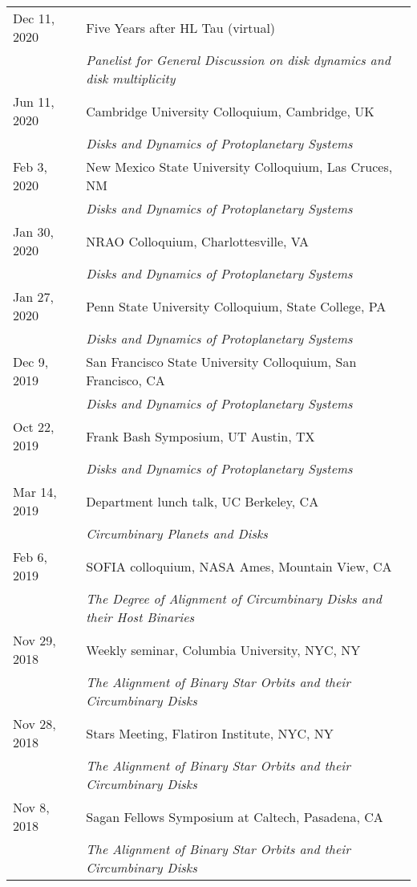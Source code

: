 \begin{longtable}{@{\hspace{10pt}}p{1.2in}l}
  Dec 11, 2020 & Five Years after HL Tau (virtual) \\ 
  & \emph{Panelist for General Discussion on disk dynamics and disk multiplicity} \\[\rowskip]
  Jun 11, 2020 & Cambridge University Colloquium, Cambridge, UK \\ 
  & \emph{Disks and Dynamics of Protoplanetary Systems} \\[\rowskip]
  Feb 3, 2020 & New Mexico State University Colloquium, Las Cruces, NM \\
  & \emph{Disks and Dynamics of Protoplanetary Systems} \\[\rowskip]
  Jan 30, 2020 & NRAO Colloquium, Charlottesville, VA \\
  & \emph{Disks and Dynamics of Protoplanetary Systems} \\[\rowskip]
  Jan 27, 2020 & Penn State University Colloquium, State College, PA \\
  & \emph{Disks and Dynamics of Protoplanetary Systems} \\[\rowskip]
  Dec 9, 2019 & San Francisco State University Colloquium, San Francisco, CA \\
  & \emph{Disks and Dynamics of Protoplanetary Systems} \\[\rowskip]
  Oct 22, 2019 & Frank Bash Symposium, UT Austin, TX \\
  & \emph{Disks and Dynamics of Protoplanetary Systems} \\[\rowskip]
  Mar 14, 2019 & Department lunch talk, UC Berkeley, CA \\
  & \emph{Circumbinary Planets and Disks} \\[\rowskip]
  Feb 6, 2019 & SOFIA colloquium, NASA Ames, Mountain View, CA \\
  & \emph{The Degree of Alignment of Circumbinary Disks and their Host Binaries} \\[\rowskip]
  Nov 29, 2018 & Weekly seminar, Columbia University, NYC, NY \\
  & \emph{The Alignment of Binary Star Orbits and their Circumbinary Disks} \\[\rowskip]
  Nov 28, 2018 & Stars Meeting, Flatiron Institute, NYC, NY \\
  & \emph{The Alignment of Binary Star Orbits and their Circumbinary Disks} \\[\rowskip]
  Nov 8, 2018 & Sagan Fellows Symposium at Caltech, Pasadena, CA \\
  & \emph{The Alignment of Binary Star Orbits and their Circumbinary Disks} \\[\rowskip]

\end{longtable}
